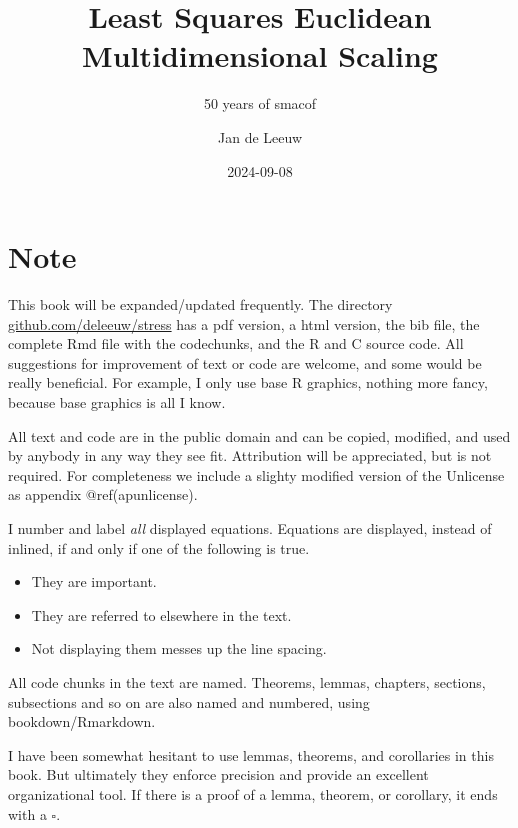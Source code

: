 \documentclass[
  12pt,
  letterpaper,
  DIV=11,
  numbers=noendperiod]{scrreprt}
\title{Least Squares Euclidean Multidimensional Scaling}
\subtitle{50 years of smacof}
\author{Jan de Leeuw}
\date{2024-09-08}
\providecommand{\tightlist}{%
  \setlength{\itemsep}{0pt}\setlength{\parskip}{0pt}}\usepackage{longtable,booktabs,array}
\renewcommand*\contentsname{Table of contents}
\newcommand\contentsname{Table of contents}
\theoremstyle{remark}
\begin{document}
\maketitle

\renewcommand*\contentsname{Table of contents}
{
\hypersetup{linkcolor=}
\setcounter{tocdepth}{2}
\tableofcontents
}


\chapter*{Note}\label{note}


This book will be expanded/updated frequently. The directory
\href{https://github.com/deleeuw/stress}{github.com/deleeuw/stress} has
a pdf version, a html version, the bib file, the complete Rmd file with
the codechunks, and the R and C source code. All suggestions for
improvement of text or code are welcome, and some would be really
beneficial. For example, I only use base R graphics, nothing more fancy,
because base graphics is all I know.

All text and code are in the public domain and can be copied, modified,
and used by anybody in any way they see fit. Attribution will be
appreciated, but is not required. For completeness we include a slighty
modified version of the Unlicense as appendix @ref(apunlicense).

I number and label \emph{all} displayed equations. Equations are
displayed, instead of inlined, if and only if one of the following is
true.

\begin{itemize}
\tightlist
\item
  They are important.
\item
  They are referred to elsewhere in the text.
\item
  Not displaying them messes up the line spacing.
\end{itemize}

All code chunks in the text are named. Theorems, lemmas, chapters,
sections, subsections and so on are also named and numbered, using
bookdown/Rmarkdown.

I have been somewhat hesitant to use lemmas, theorems, and corollaries
in this book. But ultimately they enforce precision and provide an
excellent organizational tool. If there is a proof of a lemma, theorem,
or corollary, it ends with a \(\square\).
\end{document}
